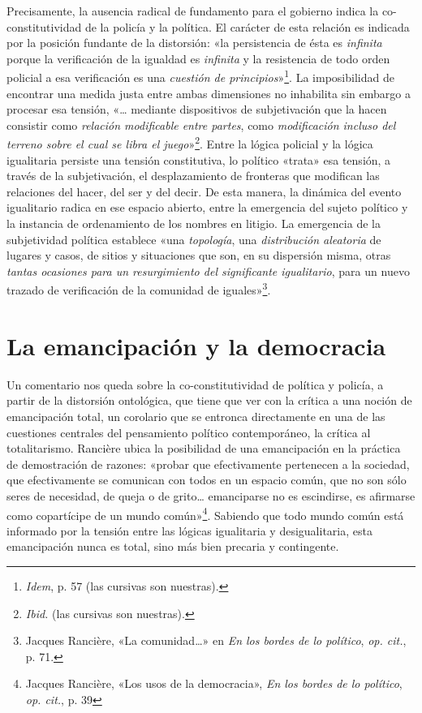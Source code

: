 Precisamente, la ausencia radical de fundamento para el gobierno indica la co-constitutividad de la policía y la política. El carácter de esta relación es indicada por la posición fundante de la distorsión: «la persistencia de ésta es \emph{infinita} porque la verificación de la igualdad es \emph{infinita} y la resistencia de todo orden policial a esa verificación es una \emph{cuestión de principios}»\footnote{\emph{Idem}, p. 57 (las cursivas son nuestras).}. La imposibilidad de encontrar una medida justa entre ambas dimensiones no inhabilita sin embargo a procesar esa tensión, «\ldots{} mediante dispositivos de subjetivación que la hacen consistir como \emph{relación modificable entre partes}, como \emph{modificación incluso del terreno sobre el cual se libra el juego}»\footnote{\emph{Ibid.} (las cursivas son nuestras).}. Entre la lógica policial y la lógica igualitaria persiste una tensión constitutiva, lo político «trata» esa tensión, a través de la subjetivación, el desplazamiento de fronteras que modifican las relaciones del hacer, del ser y del decir. De esta manera, la dinámica del evento igualitario radica en ese espacio abierto, entre la emergencia del sujeto político y la instancia de ordenamiento de los nombres en litigio. La emergencia de la subjetividad política establece «una \emph{topología}, una \emph{distribución aleatoria} de lugares y casos, de sitios y situaciones que son, en su dispersión misma, otras \emph{tantas ocasiones para un resurgimiento del significante igualitario}, para un nuevo trazado de verificación de la comunidad de iguales»\footnote{Jacques Rancière, «La comunidad\ldots» en \emph{En los bordes de lo político}, \emph{op. cit.}, p. 71.}.

\section{La emancipación y la democracia}

Un comentario nos queda sobre la co-constitutividad de política y policía, a partir de la distorsión ontológica, que tiene que ver con la crítica a una noción de emancipación total, un corolario que se entronca directamente en una de las cuestiones centrales del pensamiento político contemporáneo, la crítica al totalitarismo. Rancière ubica la posibilidad de una emancipación en la práctica de demostración de razones: «probar que efectivamente pertenecen a la sociedad, que efectivamente se comunican con todos en un espacio común, que no son sólo seres de necesidad, de queja o de grito\ldots{} emanciparse no es escindirse, es afirmarse como copartícipe de un mundo común»\footnote{Jacques Rancière, «Los usos de la democracia», \emph{En los bordes de lo político}, \emph{op. cit.}, p. 39}. Sabiendo que todo mundo común está informado por la tensión entre las lógicas igualitaria y desigualitaria, esta emancipación nunca es total, sino más bien precaria y contingente.

